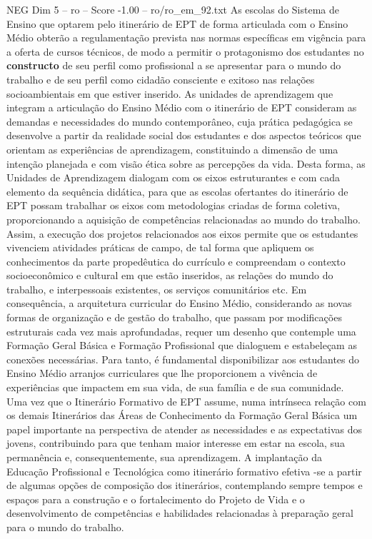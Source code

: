 \begin{textsample}{NEG Dim 5 – ro – Score -1.00 – ro/ro\_em\_92.txt}
As escolas do Sistema de Ensino que optarem pelo itinerário de EPT de forma articulada com o Ensino Médio obterão a regulamentação prevista nas normas específicas em vigência para a oferta de cursos técnicos, de modo a permitir o protagonismo dos estudantes no \textbf{constructo} de seu perfil como profissional a se apresentar para o mundo do trabalho e de seu perfil como cidadão consciente e exitoso nas relações socioambientais em que estiver inserido.
As unidades de aprendizagem que integram a articulação do Ensino Médio com o itinerário de EPT consideram as demandas e necessidades do mundo contemporâneo, cuja prática pedagógica se desenvolve a partir da realidade social dos estudantes e dos aspectos teóricos que orientam as experiências de aprendizagem, constituindo a dimensão de uma intenção planejada e com visão ética sobre as percepções da vida.
Desta forma, as Unidades de Aprendizagem dialogam com os eixos estruturantes e com cada elemento da sequência didática, para que as escolas ofertantes do itinerário de EPT possam trabalhar os eixos com metodologias criadas de forma coletiva, proporcionando a aquisição de competências relacionadas ao mundo do trabalho.
Assim, a execução dos projetos relacionados aos eixos permite que os estudantes vivenciem atividades práticas de campo, de tal forma que apliquem os conhecimentos da parte propedêutica do currículo e compreendam o contexto socioeconômico e cultural em que estão inseridos, as relações do mundo do trabalho, e interpessoais existentes, os serviços comunitários etc.
Em consequência, a arquitetura curricular do Ensino Médio, considerando as novas formas de organização e de gestão do trabalho, que passam por modificações estruturais cada vez mais aprofundadas, requer um desenho que contemple uma Formação Geral Básica e Formação Profissional que dialoguem e estabeleçam as conexões necessárias.
Para tanto, é fundamental disponibilizar aos estudantes do Ensino Médio arranjos curriculares que lhe proporcionem a vivência de experiências que impactem em sua vida, de sua família e de sua comunidade.
Uma vez que o Itinerário Formativo de EPT assume, numa intrínseca relação com os demais Itinerários das Áreas de Conhecimento da Formação Geral Básica um papel importante na perspectiva de atender as necessidades e as expectativas dos jovens, contribuindo para que tenham maior interesse em estar na escola, sua permanência e, consequentemente, sua aprendizagem.
A implantação da Educação Profissional e Tecnológica como itinerário formativo efetiva -se a partir de algumas opções de composição dos itinerários, contemplando sempre tempos e espaços para a construção e o fortalecimento do Projeto de Vida e o desenvolvimento de competências e habilidades relacionadas à preparação geral para o mundo do trabalho.

\end{textsample}
